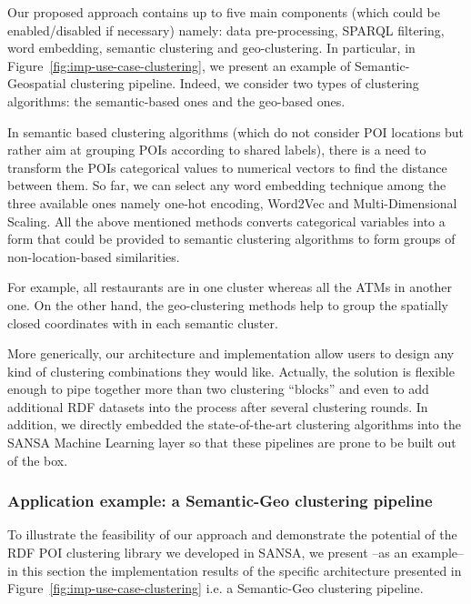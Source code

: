 Our proposed approach contains up to five main components (which could be enabled/disabled if necessary) namely: data pre-processing, \gls{SPARQL} filtering, word embedding, semantic clustering and geo-clustering.
In particular, in Figure~\ref{fig:imp-use-case-clustering}, we present an example of Semantic-Geospatial clustering pipeline.
Indeed, we consider two types of clustering algorithms: the semantic-based ones and the geo-based ones.

In semantic based clustering algorithms (which do not consider \gls{POI} locations but rather aim at grouping \gls{POI}s according to shared labels), there is a need to transform the \gls{POI}s categorical values to numerical vectors to find the distance between them. 
So far, we can select any word embedding technique among the three available ones namely one-hot encoding, Word2Vec and Multi-Dimensional Scaling.
All the above mentioned methods converts categorical variables into a form that could be provided to semantic clustering algorithms to form groups of non-location-based similarities.

For example, all restaurants are in one cluster whereas all the ATMs in another one.
On the other hand, the geo-clustering methods help to group the spatially closed coordinates with in each semantic cluster.

More generically, our architecture and implementation allow users to design any kind of clustering combinations they would like. Actually, the solution is flexible enough to pipe together more than two clustering ``blocks'' and even to add additional \gls{RDF} datasets into the process after several clustering rounds. In addition, we directly embedded the state-of-the-art clustering algorithms into the SANSA Machine Learning layer so that these pipelines are prone to be built out of the box.


\subsubsection{Application example: a Semantic-Geo clustering pipeline}

To illustrate the feasibility of our approach and demonstrate the potential of the \gls{RDF} \gls{POI} clustering library we developed in SANSA, we present --as an example-- in this section the implementation results of the specific architecture presented in Figure~\ref{fig:imp-use-case-clustering} i.e. a Semantic-Geo clustering pipeline.


